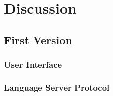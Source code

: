 \chapter{Discussion}

\section{First Version}

\subsection{User Interface}

\subsection{Language Server Protocol}